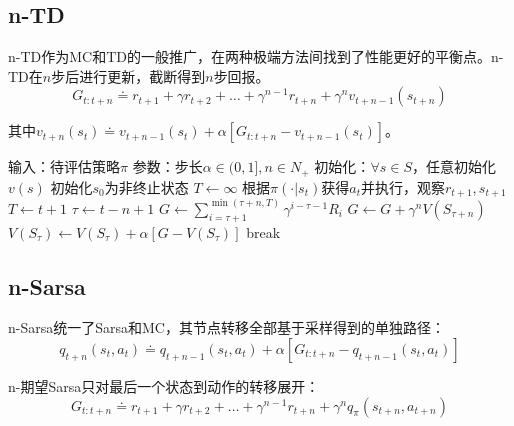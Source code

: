 \documentclass[
12pt, %
a4paper, 
oneside, %
headinclude,footinclude, %
]{scrartcl}
\begin{document}
\subsection[n-TD]{n-TD}
n-TD作为MC和TD的一般推广，在两种极端方法间找到了性能更好的平衡点。n-TD在$ n $步后进行更新，截断得到$ n $步回报。
$$ G_{t:t + n} \doteq r_{t + 1} + \gamma r_{t + 2} + \dots + \gamma^{n - 1} r_{t + n} + \gamma^n v_{t + n - 1}(s_{t + n}) $$

其中$ v_{t + n}(s_t) \doteq v_{t + n - 1}(s_t) + \alpha[G_{t:t + n} - v_{t + n - 1}(s_t)] $。
\begin{myalgorithm}[n-TD]
\State 输入：待评估策略$ \pi $
\State 参数：步长$ \alpha \in (0,1], n \in N_+ $
\State 初始化：$ \forall s \in S $，任意初始化$ v(s) $
\State 初始化$ s_0 $为非终止状态
\State $ T \gets \infty $
\State 根据$ \pi(\cdot|s_t) $获得$ a_t $并执行，观察$ r_{t + 1}, s_{t + 1} $
\State $ T \gets t + 1 $
\EndIf
\EndIf
\State $ \tau \gets t - n + 1 $ 
\State $ G \gets \sum_{i = \tau + 1}^{\min(\tau + n,T)} \gamma^{i - \tau - 1}R_i $
\State $ G \gets G + \gamma^n V(S_{\tau + n}) $
\EndIf
\State $ V(S_{\tau}) \gets V(S_{\tau}) + \alpha[G - V(S_{\tau})] $
\EndIf
{}
\State break
\EndIf
\EndFor
\EndFor
\end{myalgorithm}
\subsection[n-Sarsa]{n-Sarsa}
n-Sarsa统一了Sarsa和MC，其节点转移全部基于采样得到的单独路径：
$$ q_{t + n}(s_t, a_t) \doteq q_{t + n - 1}(s_t, a_t) + \alpha [G_{t:t + n} - q_{t + n - 1}(s_t, a_t)] $$

n-期望Sarsa只对最后一个状态到动作的转移展开：
$$ G_{t:t + n} \doteq r_{t + 1} + \gamma r_{t + 2} + \dots + \gamma^{n - 1} r_{t + n} + \gamma^n q_{\pi}(s_{t + n}, a_{t + n}) $$
\end{document}
